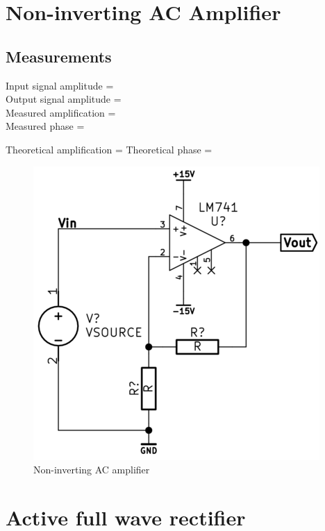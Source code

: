 \documentclass[]{article}
\begin{document}
\section{Non-inverting AC Amplifier}\label{non-inverting-ac-amplifier}

\subsection{Measurements}\label{measurements-3}

Input signal amplitude =\\Output signal amplitude =\\Measured
amplification =\\Measured phase =

Theoretical amplification = Theoretical phase =

\begin{figure}[htbp]
\centering
\includegraphics[scale=0.5]{img/noninvACamp.png}
\caption{Non-inverting AC amplifier}
\end{figure}


\section{Active full wave rectifier}\label{active-full-wave-rectifier}
\end{document}
